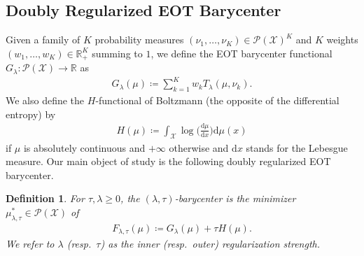 \documentclass[11pt]{article}
\newcommand{\RR}{\mathbb{R}}
\newcommand{\Pp}{\mathcal{P}}
\newcommand{\Xx}{\mathcal{X}}
\renewcommand{\d}{\mathrm{d}}
\newtheorem{definition}[theorem]{Definition}
\begin{document}
\subsection{Doubly Regularized EOT Barycenter}\label{sec:intro-douba}

Given a family of $K$ probability measures $(\nu_1,\dots,\nu_K)\in \Pp(\Xx)^K$ and $K$ weights $(w_1,\dots,w_K)\in \RR_+^K$ summing to $1$, we define the EOT barycenter functional $G_\lambda:\Pp(\Xx)\to \RR$ as
\begin{align}\label{eq:G}
G_\lambda(\mu) \coloneqq \sum_{k=1}^K w_kT_\lambda(\mu,\nu_k).
\end{align}
We also define the $H$-functional of Boltzmann (the opposite of the differential entropy) by 
\begin{align}\label{eq:entropy}
H(\mu) \coloneqq  \int_\Xx \log\Big(\frac{\d \mu}{\d x}\Big)\d \mu(x)
\end{align}
if $\mu$ is absolutely continuous and $+\infty$ otherwise and  $\d x$ stands for the Lebesgue measure. Our main object of study is the following doubly regularized EOT barycenter.


\begin{assbox}
\begin{definition}\label{def:debiaised-barycenter} For $\tau,\lambda\geq 0$, the \emph{$(\lambda,\tau)$-barycenter} is the minimizer $\mu^*_{\lambda,\tau} \in \Pp(\Xx)$ of
\begin{align}\label{eq:optim-objective}
F_{\lambda,\tau}(\mu) \coloneqq G_\lambda(\mu) + \tau H(\mu).
\end{align}
We refer to $\lambda$ (resp.~$\tau$) as the \emph{inner} (resp.~\emph{outer}) regularization strength.
\end{definition}
\end{assbox}
\end{document}

